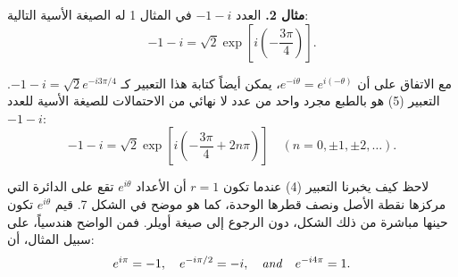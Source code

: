 



	\renewcommand{\thefootnote}{\ar{(\arabic{footnote})}}
	\renewcommand{\figurename}{الشكل}
	\abovedisplayskip=3pt
	\belowdisplayskip=3pt
	\renewcommand{\jot}{10pt}
	\renewcommand{\theequation}{\arabic{equation}.\arabic{chapter}}
	
	
	
	
	\textbf{مثال 2.} العدد $-1 - i$ في المثال 1 له الصيغة الأسية التالية:
	\begin{equation}
		-1 - i = \sqrt{2} \exp \left[ i \left( -\frac{3\pi}{4} \right) \right]. \tag{5}
	\end{equation}
	
	مع الاتفاق على أن $e^{-i\theta} = e^{i(-\theta)}$، يمكن أيضاً كتابة هذا التعبير كـ $-1 - i = \sqrt{2} e^{-i3\pi/4}$. التعبير (5) هو بالطبع مجرد واحد من عدد لا نهائي من الاحتمالات للصيغة الأسية للعدد $-1 - i$:
	\begin{equation}
		-1 - i = \sqrt{2} \exp \left[ i \left( -\frac{3\pi}{4} + 2n\pi \right) \right] \quad (n = 0, \pm 1, \pm 2, \dots). \tag{6}
	\end{equation}
	
	لاحظ كيف يخبرنا التعبير (4) عندما تكون $r = 1$ أن الأعداد $e^{i\theta}$ تقع على الدائرة التي مركزها نقطة الأصل ونصف قطرها الوحدة، كما هو موضح في الشكل 7. قيم $e^{i\theta}$ تكون حينها مباشرة من ذلك الشكل، دون الرجوع إلى صيغة أويلر. فمن الواضح هندسياً، على سبيل المثال، أن:
	\[
	e^{i\pi} = -1, \quad e^{-i\pi/2} = -i, \quad \text{\textit{and}} \quad e^{-i4\pi} = 1.
	\]
	
	
